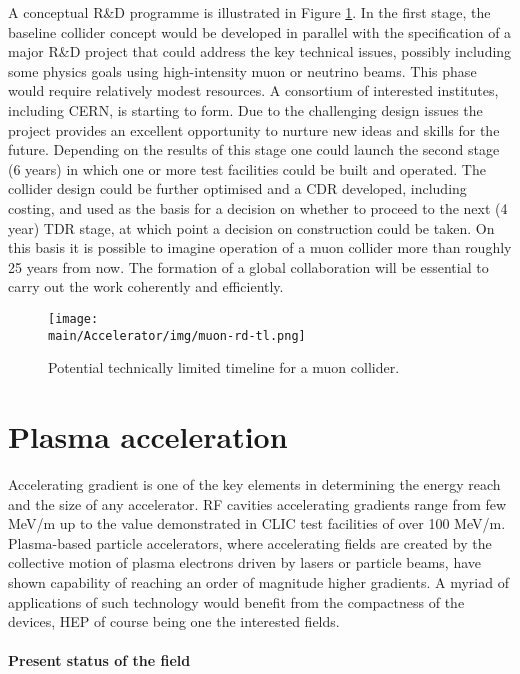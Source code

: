 A conceptual R\&D programme is illustrated in Figure \ref{fig:muonrd}. In the first stage, the baseline collider concept would be developed in parallel with the specification of a major R\&D project that could address the key technical issues, possibly including some physics goals using high-intensity muon or neutrino beams. This phase would require relatively modest resources. A consortium of interested institutes, including CERN, is starting to form. Due to the challenging design issues the project provides an excellent opportunity to nurture new ideas and  skills for the future. Depending on the results of this stage one could launch the second stage (6 years) in which one or more test facilities could be built and operated. The collider design could be further optimised and a CDR developed, including costing, and used as the basis for a decision on whether to proceed to the next (4 year) TDR stage, at which point a decision on construction could be taken. On this basis it is possible to imagine operation of a muon collider more than roughly 25 years from now. The formation of a global collaboration will be essential to carry out the work coherently and efficiently. 

 \begin{figure}[ht]
 \centering
 \texttt{[image: \\main/Accelerator/img/muon-rd-tl.png]}
 \caption{Potential technically limited timeline for a muon collider.}
\label{fig:muonrd}
\end{figure}

\section{Plasma acceleration}
\label{sec:plasma}
Accelerating gradient is one of the key elements in determining the energy reach and the size of any accelerator. RF cavities accelerating gradients range from few MeV/m up to the value demonstrated in CLIC test facilities of over 100 MeV/m. Plasma-based particle accelerators, where accelerating fields are created by the collective motion of plasma electrons driven by lasers or particle beams, have shown capability of reaching an order of magnitude higher gradients. A myriad of applications of such technology would benefit from the compactness of the devices, HEP of course being  one the interested fields.

\paragraph*{Present status of the field}

